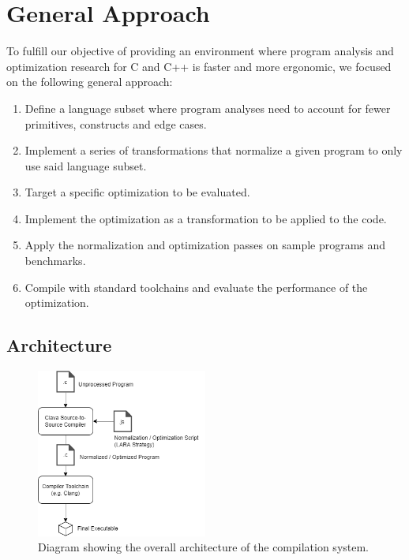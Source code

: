 \chapter{General Approach}\label{chap:gen_approach}

To fulfill our objective of providing an environment where program analysis and optimization research for C and C++ is faster and more ergonomic, we focused on the following general approach:

\begin{enumerate}
    \item Define a language subset where program analyses need to account for fewer primitives, constructs and edge cases.
    \item Implement a series of transformations that normalize a given program to only use said language subset.
    \item Target a specific optimization to be evaluated.
    \item Implement the optimization as a transformation to be applied to the code.
    \item Apply the normalization and optimization passes on sample programs and benchmarks.
    \item Compile with standard toolchains and evaluate the performance of the optimization.
\end{enumerate}

\section{Architecture}

\begin{figure}
    \centering
    \includegraphics[width=0.5\textwidth]{figures/general_architecture.png}
    \caption{Diagram showing the overall architecture of the compilation system.}
    \label{fig:general_arch}
\end{figure}

